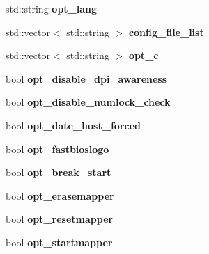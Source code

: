\begin{DoxyCompactItemize}
\item 
\hypertarget{classConfig_a077860660ed77a40cf5ff1540873d9d6}{std\-::string {\bfseries opt\-\_\-lang}}\label{classConfig_a077860660ed77a40cf5ff1540873d9d6}

\item 
\hypertarget{classConfig_a4842020c7194c3b5c02980c2cd7c59d5}{std\-::vector$<$ std\-::string $>$ {\bfseries config\-\_\-file\-\_\-list}}\label{classConfig_a4842020c7194c3b5c02980c2cd7c59d5}

\item 
\hypertarget{classConfig_ace110896f67f0404622ef497e652ea3b}{std\-::vector$<$ std\-::string $>$ {\bfseries opt\-\_\-c}}\label{classConfig_ace110896f67f0404622ef497e652ea3b}

\item 
\hypertarget{classConfig_a64fd0847634fc174dbd521607116a0c7}{bool {\bfseries opt\-\_\-disable\-\_\-dpi\-\_\-awareness}}\label{classConfig_a64fd0847634fc174dbd521607116a0c7}

\item 
\hypertarget{classConfig_a9265412e49f5228d63c506ceab66a6c2}{bool {\bfseries opt\-\_\-disable\-\_\-numlock\-\_\-check}}\label{classConfig_a9265412e49f5228d63c506ceab66a6c2}

\item 
\hypertarget{classConfig_a84bdd8a5d672f1e15b2ac8f5eca497ff}{bool {\bfseries opt\-\_\-date\-\_\-host\-\_\-forced}}\label{classConfig_a84bdd8a5d672f1e15b2ac8f5eca497ff}

\item 
\hypertarget{classConfig_a7a559bbc38f1b51bef7115e31405da2c}{bool {\bfseries opt\-\_\-fastbioslogo}}\label{classConfig_a7a559bbc38f1b51bef7115e31405da2c}

\item 
\hypertarget{classConfig_abbaadb9fcb5ab3065a8728cf271e4bc8}{bool {\bfseries opt\-\_\-break\-\_\-start}}\label{classConfig_abbaadb9fcb5ab3065a8728cf271e4bc8}

\item 
\hypertarget{classConfig_ae4e0136fb9b65400cb317f60e3c1b64d}{bool {\bfseries opt\-\_\-erasemapper}}\label{classConfig_ae4e0136fb9b65400cb317f60e3c1b64d}

\item 
\hypertarget{classConfig_af9f2964b9f782effb00e13a8c33af411}{bool {\bfseries opt\-\_\-resetmapper}}\label{classConfig_af9f2964b9f782effb00e13a8c33af411}

\item 
\hypertarget{classConfig_a20c5b48a8fb54c1ba41be07901dea768}{bool {\bfseries opt\-\_\-startmapper}}\label{classConfig_a20c5b48a8fb54c1ba41be07901dea768}


\end{DoxyCompactItemize}
